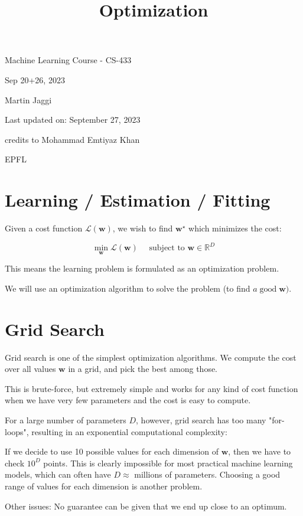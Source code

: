 \documentclass[10pt]{article}
\title{Optimization }
\author{}
\date{}
\begin{document}
\maketitle
Machine Learning Course - CS-433

Sep 20+26, 2023

Martin Jaggi

Last updated on: September 27, 2023

credits to Mohammad Emtiyaz Khan

EPFL

\section*{Learning / Estimation / Fitting}
Given a cost function $\mathcal{L}(\mathbf{w})$, we wish to find $\mathbf{w}^{\star}$ which minimizes the cost:

$$
\min _{\mathbf{w}} \mathcal{L}(\mathbf{w}) \quad \text { subject to } \mathbf{w} \in \mathbb{R}^{D}
$$

This means the learning problem is formulated as an optimization problem.

We will use an optimization algorithm to solve the problem (to find $a \operatorname{good} \mathbf{w})$.

\section*{Grid Search}
Grid search is one of the simplest optimization algorithms. We compute the cost over all values $\mathbf{w}$ in a grid, and pick the best among those.

This is brute-force, but extremely simple and works for any kind of cost function when we have very few parameters and the cost is easy to compute.

For a large number of parameters $D$, however, grid search has too many "for-loops", resulting in an exponential computational complexity:

If we decide to use 10 possible values for each dimension of $\mathbf{w}$, then we have to check $10^{D}$ points. This is clearly impossible for most practical machine learning models, which can often have $D \approx$ millions of parameters. Choosing a good range of values for each dimension is another problem.

Other issues: No guarantee can be given that we end up close to an optimum.
\end{document}
